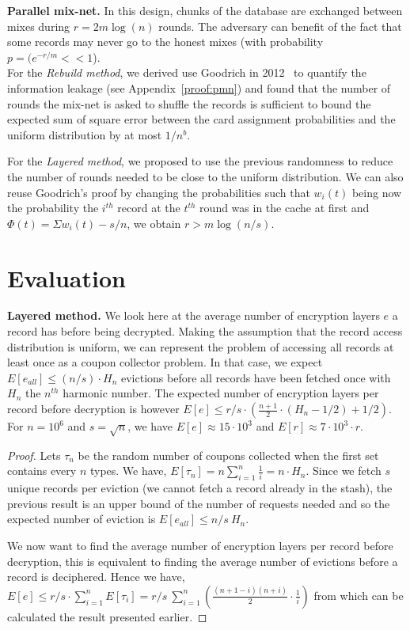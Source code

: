 \documentclass{llncs}
\begin{document}
\noindent\textbf{Parallel mix-net.}
In this design, chunks of the database are exchanged between mixes during $r=2m\log(n)$ rounds. The adversary can benefit of the fact that some records may never go to the honest mixes (with probability $p=(e^{-r/m} << 1$).\\

For the \emph{Rebuild method}, we derived use Goodrich in 2012~\cite{goodrich2012anonymous} to quantify the information leakage (see Appendix~\ref{proof:pmn}) and found that the number of rounds the mix-net is asked to shuffle the records is sufficient to bound the expected sum of square error between the card assignment probabilities and the uniform distribution by at most $1/n^b$.

For the \emph{Layered method}, we proposed to use the previous randomness to reduce the number of rounds needed to be close to the uniform distribution. We can also reuse Goodrich's proof by changing the probabilities such that $w_i(t)$ being now the probability the $i^{th}$ record at the $t^{th}$ round was in the cache at first and $\Phi(t)=\Sigma w_i(t) - s/n$, we obtain $r>m\log(n/s)$.


\section{Evaluation}\label{Evaluation}
\textbf{Layered method.} We look here at the average number of encryption layers $e$ a record has before being decrypted. Making the assumption that the record access distribution is uniform, we can represent the problem of accessing all records at least once as a coupon collector problem. In that case, we expect $E[e_{all}]\leq(n/s)\cdot H_n$ evictions before all records have been fetched once with $H_n$ the $n^{th}$ harmonic number. The expected number of encryption layers per record before decryption is however $E[e]\leq{r/s} \cdot \left ( \frac{n+1}{2}\cdot(H_n-1/2)+1/2 \right )$. For $n=10^6$ and $s=\sqrt{n}$, we have $E[e]\approx 15 \cdot 10^3$ and $E[r]\approx 7\cdot 10^3 \cdot r$.
\begin{proof}
Lets $\tau_n$ be the random number of coupons collected when the first set contains every $n$ types. We have, $E[\tau_n]=n\sum_{i=1}^n \frac{1}{i} = n \cdot H_n$.
Since we fetch $s$ unique records per eviction (we cannot fetch a record already in the stash), the previous result is an upper bound of the number of requests needed and so the expected number of eviction is $E[e_{all}]\leq n/s\ H_n$.

We now want to find the average number of encryption layers per record before decryption, this is equivalent to finding the average number of evictions before a record is deciphered. 
Hence we have, $E[e]\leq r/s \cdot \sum_{i=1}^n E[\tau_i] = r/s\ \sum_{i=1}^n \left (\frac{(n+1-i)(n+i)}{2}\cdot \frac{1}{i}\right )$ from which can be calculated the result presented earlier. 
\end{proof}
\end{document}
